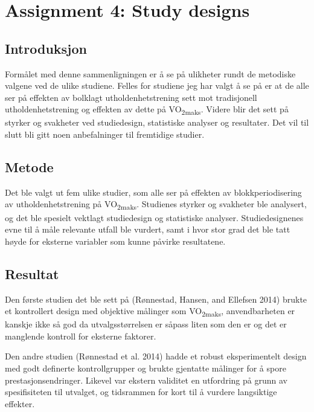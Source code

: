 \documentclass[
  letterpaper,
  DIV=11,
  numbers=noendperiod]{scrreprt}
\begin{document}
\chapter{Assignment 4: Study designs}\label{assignment-4-study-designs}

\section{Introduksjon}\label{introduksjon-3}

Formålet med denne sammenligningen er å se på ulikheter rundt de
metodiske valgene ved de ulike studiene. Felles for studiene jeg har
valgt å se på er at de alle ser på effekten av bolklagt
utholdenhetstrening sett mot tradisjonell utholdenhetstrening og
effekten av dette på VO\textsubscript{2maks}. Videre blir det sett på
styrker og svakheter ved studiedesign, statistiske analyser og
resultater. Det vil til slutt bli gitt noen anbefalninger til fremtidige
studier.

\section{Metode}\label{metode-4}

Det ble valgt ut fem ulike studier, som alle ser på effekten av
blokkperiodisering av utholdenhetstrening på VO\textsubscript{2maks}.
Studienes styrker og svakheter ble analysert, og det ble spesielt
vektlagt studiedesign og statistiske analyser. Studiedesignenes evne til
å måle relevante utfall ble vurdert, samt i hvor stor grad det ble tatt
høyde for eksterne variabler som kunne påvirke resultatene.

\section{Resultat}\label{resultat-4}

Den første studien det ble sett på (Rønnestad, Hansen, and Ellefsen
2014) brukte et kontrollert design med objektive målinger som
VO\textsubscript{2maks}, anvendbarheten er kanskje ikke så god da
utvalgsstørrelsen er såpass liten som den er og det er manglende
kontroll for eksterne faktorer.

Den andre studien (Rønnestad et al. 2014) hadde et robust eksperimentelt
design med godt definerte kontrollgrupper og brukte gjentatte målinger
for å spore prestasjonsendringer. Likevel var ekstern validitet en
utfordring på grunn av spesifisiteten til utvalget, og tidsrammen for
kort til å vurdere langsiktige effekter.
\end{document}
